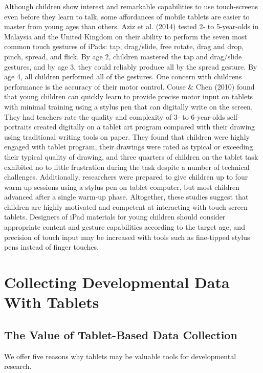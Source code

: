 \documentclass[man,noapacite]{apa2}
\begin{document}
Although children show interest and remarkable capabilities to use touch-screens even before they learn to talk, some affordances of mobile tablets are easier to master from young ages than others. Aziz et al. (2014) tested 2- to 5-year-olds in Malaysia and the United Kingdom on their ability to perform the seven most common touch gestures of iPads: tap, drag/slide, free rotate, drag and drop, pinch, spread, and flick. By age 2, children mastered the tap and drag/slide gestures, and by age 3, they could reliably produce all by the spread gesture. By age 4, all children performed all of the gestures. One concern with childrens performance is the accuracy of their motor control. Couse \& Chen (2010) found that young children can quickly learn to provide precise motor input on tablets with minimal training using a stylus pen that can digitally write on the screen. They had teachers rate the quality and complexity of 3- to 6-year-olds self-portraits created digitally on a tablet art program compared with their drawing using traditional writing tools on paper. They found that children were highly engaged with tablet program, their drawings were rated as typical or exceeding their typical quality of drawing, and three quarters of children on the tablet task exhibited no to little frustration during the task despite a number of technical challenges. Additionally, researchers were prepared to give children up to four warm-up sessions using a stylus pen on tablet computer, but most children advanced after a single warm-up phase. Altogether, these studies suggest that children are highly motivated and competent at interacting with touch-screen tablets. Designers of iPad materials for young children should consider appropriate content and gesture capabilities according to the target age, and precision of touch input may be increased with tools such as fine-tipped stylus pens instead of finger touches.

\section{Collecting Developmental Data With Tablets}

\subsection{The Value of Tablet-Based Data Collection}

We offer five reasons why tablets may be valuable tools for developmental research.
\end{document}

